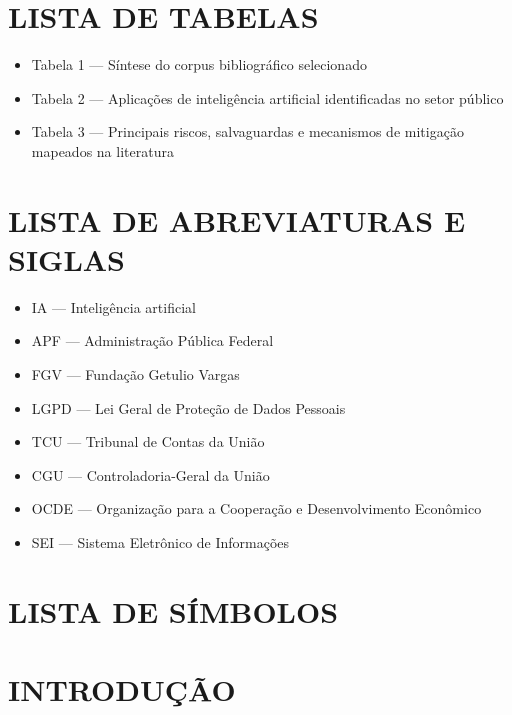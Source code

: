 \documentclass[12pt,a4paper]{article}
\begin{document}
\section*{LISTA DE TABELAS}
\label{sec:orgde79516}
\begin{itemize}
\item Tabela 1 — Síntese do corpus bibliográfico selecionado
\item Tabela 2 — Aplicações de inteligência artificial identificadas no setor público
\item Tabela 3 — Principais riscos, salvaguardas e mecanismos de mitigação mapeados na literatura
\end{itemize}
\section*{LISTA DE ABREVIATURAS E SIGLAS}
\label{sec:org3683e9e}
\begin{itemize}
\item IA — Inteligência artificial
\item APF — Administração Pública Federal
\item FGV — Fundação Getulio Vargas
\item LGPD — Lei Geral de Proteção de Dados Pessoais
\item TCU — Tribunal de Contas da União
\item CGU — Controladoria-Geral da União
\item OCDE — Organização para a Cooperação e Desenvolvimento Econômico
\item SEI — Sistema Eletrônico de Informações
\end{itemize}
\section*{LISTA DE SÍMBOLOS}
\label{sec:org1e638af}
\section{INTRODUÇÃO}
\label{sec:org612e52a}
\end{document}

